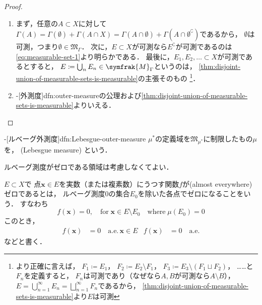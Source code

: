 \documentclass[../sotsu.tex]{subfiles}
\begin{document}
\begin{proof}
    \begin{enumerate}
    \item まず，任意の$A \subset X$に対して$Γ(A) = Γ(\emptyset) + Γ(A \cap X) = Γ(A \cap \emptyset) + Γ(A \cap \emptyset^{\complement})$であるから，
        $\emptyset$は可測，つまり$\emptyset \in 𝔐_Γ$．
        次に，$E \subset X$が可測なら$E^{\complement}$が可測であるのは\cref{eq:measurable-set-1}より明らかである．
        最後に，$E_1, E_2, \dotsc \subset X$が可測であるとすると，
        $E \coloneq \bigcup_{n} E_n \in \symfrak{M}_{\Gamma}$というのは，
        \cref{thm:disjoint-union-of-measurable-sets-is-measurable}の主張そのもの%
        \footnote{
            より正確に言えば，
            $F_1 \coloneq E_1$，
            $F_2 \coloneq E_2 \setminus F_1$，
            $F_3 \coloneq E_3 \setminus (F_1 \sqcup F_2)$，
            ……と$F_n$を定義すると，
            $F_n$は可測であり（なぜなら$A, B$が可測なら$A \setminus B$），
            $E = \bigcup_{n=1}^{\infty} E_n = \bigsqcup_{n=1}^{\infty} F_n$であるから，
            \cref{thm:disjoint-union-of-measurable-sets-is-measurable}より$E$は可測
        }．
    \item {}-[外測度]{dfn:outer-measure}の公理および\cref{thm:disjoint-union-of-measurable-sets-is-measurable}よりいえる．
    \end{enumerate}
\end{proof}



\begin{definition}
    \label{dfn:Lebesgue-measure}
    -[ルベーグ外測度]{dfn:Lebesgue-outer-measure}%
    $\mu^*$の定義域を$𝔐_{\mu^*}$に制限したもの$\mu$を，
    (Lebesgue measure)
    という．
\end{definition}


ルベーグ測度がゼロである領域は考慮しなくてよい．

\begin{definition}
    \label{dfn:almost-everywhere}
    $E \subset X$で
    点$\symbf{x} \in E$を実数（または複素数）にうつす関数$f$が(almost everywhere)ゼロであるとは，
    ルベーグ測度$0$の集合$E_0$を除いた各点でゼロになることをいう．
    すなわち
    \begin{equation*}
        f(\symbf{x}) = 0  ,
        \quad  \text{for}   \; \symbf{x} \in E \setminus E_0  
        \quad  \text{where} \; \mu(E_0) = 0
    \end{equation*}
    このとき，
    \begin{align*}
        f(\symbf{x}) &= 0  \quad  \text{a.e.} \, \symbf{x} \in E
        &
        f(\symbf{x}) &= 0  \quad  \text{a.e.}
    \end{align*}
    などと書く．
\end{definition}
\end{document}
